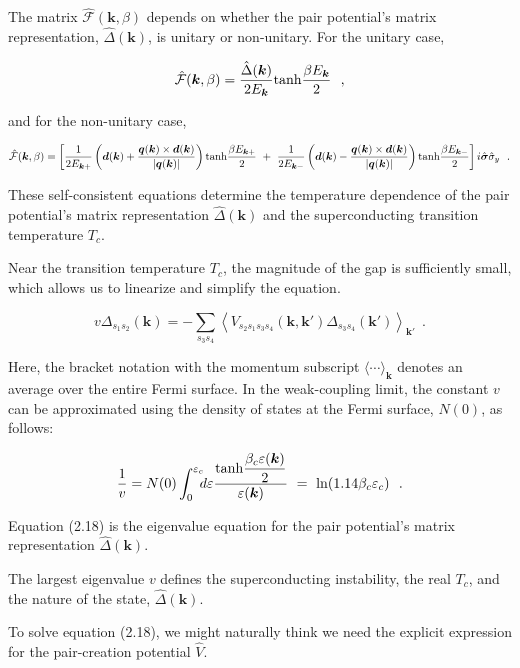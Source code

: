 \documentclass[uplatex,a4j,12pt,dvipdfmx]{jsarticle}
\begin{document}
The matrix $\hat{\mathcal{F}}(\bm{k},\beta)$ depends on whether the pair potential's matrix representation, $\hat{\Delta}(\bm{k})$, is unitary or non-unitary.
For the unitary case,

\[
	\hat{\mathcal{F}}(\bm{k},\beta)
	=
	\dfrac{ \hat{\Delta}(\bm{k}) }{ 2 E_{\bm{k}} }
	{\rm tanh}\dfrac{\beta E_{\bm{k}}}{2}
	\ \ ,
\]

and for the non-unitary case,

\[
	\hat{\mathcal{F}}(\bm{k},\beta)
	=
	\left[
		\dfrac{ 1 }{ 2 E_{\bm{k} +} }
		\left(
		\bm{d}(\bm{k})
		+
		\dfrac{\bm{q}(\bm{k}) \times \bm{d}(\bm{k})}{|\bm{q}(\bm{k})|}
		\right)
		{\rm tanh}\dfrac{\beta E_{\bm{k}+}}{2}
		\ + \
		\dfrac{ 1 }{ 2 E_{\bm{k} -} }
		\left(
		\bm{d}(\bm{k})
		-
		\dfrac{\bm{q}(\bm{k}) \times \bm{d}(\bm{k})}{|\bm{q}(\bm{k})|}
		\right)
		{\rm tanh}\dfrac{\beta E_{\bm{k}-}}{2}
		\right]
	i \hat{\bm{\sigma}} \hat{\sigma}_{y}
	\ \ .
\]

These self-consistent equations determine the temperature dependence of the pair potential's matrix representation $\hat{\Delta}(\bm{k})$ and the superconducting transition temperature $T_{c}$.

Near the transition temperature $T_{c}$, the magnitude of the gap is sufficiently small, which allows us to linearize and simplify the equation.

\[
	v \Delta_{s_{1} s_{2}}(\bm{k})
	=
	- \sum_{s_{3} s_{4}}
	\left\langle
	V_{ s_{2} s_{1} s_{3} s_{4} } (\bm{k} , \bm{k}')
	\Delta_{s_{3} s_{4}} (\bm{k}')
	\right\rangle_{\bm{k}'}
	\ \ .
\]

Here, the bracket notation with the momentum subscript $\langle \cdots \rangle_{\bm{k}}$ denotes an average over the entire Fermi surface.
In the weak-coupling limit, the constant $v$ can be approximated using the density of states at the Fermi surface, $N(0)$, as follows:

\[
	\dfrac{1}{v}
	=
	N(0)
	\int^{\varepsilon_{c}}_{0}
	\!\!\! d \varepsilon
	\dfrac{{\rm tanh}\dfrac{\beta_{c} \varepsilon(\bm{k})}{2}}{\varepsilon(\bm{k})}
	\ = \
	{\rm ln}(1.14 \beta_{c} \varepsilon_{c})
	\ \ .
\]


Equation (2.18) is the eigenvalue equation for the pair potential's matrix representation $\hat{\Delta}(\bm{k})$.

The largest eigenvalue $v$ defines the superconducting instability, the real $T_{c}$, and the nature of the state, $\hat{\Delta}(\bm{k})$.

To solve equation (2.18), we might naturally think we need the explicit expression for the pair-creation potential $\hat{V}$.
\end{document}
